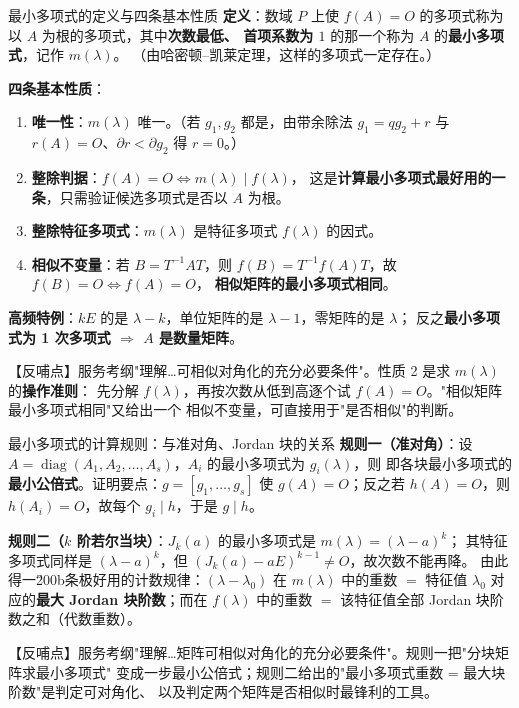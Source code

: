 \begin{fdeep}{最小多项式的定义与四条基本性质}
\textbf{定义}：数域 $P$ 上使 $f(A)=O$ 的多项式称为以 $A$ 为根的多项式，其中\textbf{次数最低、
首项系数为 $1$} 的那一个称为 $A$ 的\textbf{最小多项式}，记作 $m(\lambda)$。
（由哈密顿--凯莱定理，这样的多项式一定存在。）

\textbf{四条基本性质}：
\begin{enumerate}[leftmargin=2.2em,itemsep=0.2em]
\item \textbf{唯一性}：$m(\lambda)$ 唯一。（若 $g_1,g_2$ 都是，由带余除法 $g_1=qg_2+r$ 与
      $r(A)=O$、$\partial r<\partial g_2$ 得 $r=0$。）
\item \textbf{整除判据}：$f(A)=O\iff m(\lambda)\mid f(\lambda)$，
      这是\textbf{计算最小多项式最好用的一条}，只需验证候选多项式是否以 $A$ 为根。
\item \textbf{整除特征多项式}：$m(\lambda)$ 是特征多项式 $f(\lambda)$ 的因式。
\item \textbf{相似不变量}：若 $B=T^{-1}AT$，则 $f(B)=T^{-1}f(A)T$，故 $f(B)=O\iff f(A)=O$，
      \textbf{相似矩阵的最小多项式相同}。
\end{enumerate}
\textbf{高频特例}：$kE$ 的是 $\lambda-k$，单位矩阵的是 $\lambda-1$，零矩阵的是 $\lambda$；
反之\textbf{最小多项式为 1 次多项式 $\Rightarrow$ $A$ 是数量矩阵}。

【反哺点】服务考纲"理解…可相似对角化的充分必要条件"。性质 2 是求 $m(\lambda)$ 的\textbf{操作准则}：
先分解 $f(\lambda)$，再按次数从低到高逐个试 $f(A)=O$。"相似矩阵最小多项式相同"又给出一个
相似不变量，可直接用于"是否相似"的判断。
\end{fdeep}

\begin{fdeep}{最小多项式的计算规则：与准对角、Jordan 块的关系}
\textbf{规则一（准对角）}：设 $A=\operatorname{diag}(A_1,A_2,\dots,A_s)$，$A_i$ 的最小多项式为 $g_i(\lambda)$，则
即各块最小多项式的\textbf{最小公倍式}。证明要点：$g=[g_1,\dots,g_s]$ 使 $g(A)=O$；反之若
$h(A)=O$，则 $h(A_i)=O$，故每个 $g_i\mid h$，于是 $g\mid h$。

\textbf{规则二（$k$ 阶若尔当块）}：$J_k(a)$ 的最小多项式是 $m(\lambda)=(\lambda-a)^{k}$；
其特征多项式同样是 $(\lambda-a)^k$，但 $(J_k(a)-aE)^{k-1}\ne O$，故次数不能再降。
由此得一\u200b条极好用的计数规律：$(\lambda-\lambda_0)$ 在 $m(\lambda)$ 中的重数
$=$ 特征值 $\lambda_0$ 对应的\textbf{最大 Jordan 块阶数}；而在 $f(\lambda)$ 中的重数
$=$ 该特征值全部 Jordan 块阶数之和（代数重数）。

【反哺点】服务考纲"理解…矩阵可相似对角化的充分必要条件"。规则一把"分块矩阵求最小多项式"
变成一步最小公倍式；规则二给出的"最小多项式重数 = 最大块阶数"是判定可对角化、
以及判定两个矩阵是否相似时最锋利的工具。
\end{fdeep}

